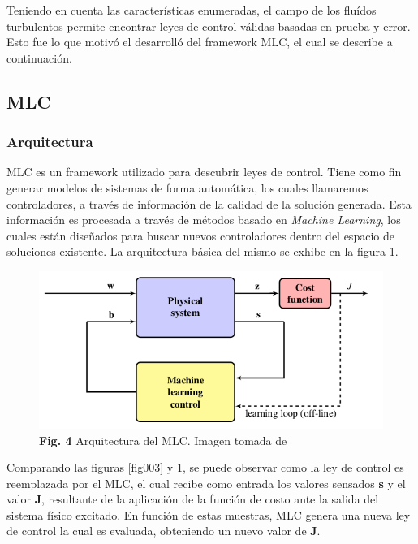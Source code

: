 \documentclass[a4paper,10pt]{article}
\begin{document}
        Teniendo en cuenta las características enumeradas, el campo de los fluídos turbulentos permite encontrar leyes de control válidas
        basadas en prueba y error. Esto fue lo que motivó el desarrolló del framework MLC, el cual se describe a continuación.

    \subsection{MLC} \label{sec:mlc}
    \subsubsection{Arquitectura}
        MLC es un framework utilizado para descubrir leyes de control. Tiene como fin generar modelos de sistemas de forma automática,
        los cuales llamaremos controladores, a través de información de la calidad de la solución generada. Esta información es procesada
        a través de métodos basado en \textit{Machine Learning}, los cuales están diseñados para buscar nuevos controladores dentro del
        espacio de soluciones existente. La arquitectura básica del mismo se exhibe en la figura \ref{fig004}.

        \begin{figure}[!Hhtb]
            \centering
            \includegraphics[width=12cm,origin=c]{Imagenes/MLC_architecture.png}
            \caption{\textbf{Fig. 4} Arquitectura del MLC. Imagen tomada de \cite{Duriez2016}} \label{fig004}
        \end{figure}

        \indent Comparando las figuras \ref{fig003} y \ref{fig004}, se puede observar como la ley de control es reemplazada por el MLC,
        el cual recibe como entrada los valores sensados \textbf{s} y el valor \textbf{J}, resultante de la aplicación de la función de
        costo ante la salida del sistema físico excitado. En función de estas muestras, MLC genera una nueva ley de control la cual es
        evaluada, obteniendo un nuevo valor de \textbf{J}.
\end{document}
